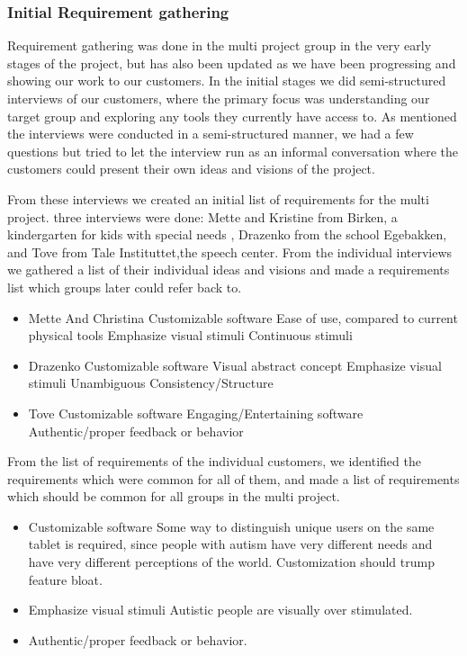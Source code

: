 \subsubsection*{Initial Requirement gathering}
Requirement gathering was done in the multi project group in the very early stages of the project, but has also been updated as we have been progressing and showing our work to our customers.
In the initial stages we did semi-structured interviews of our customers, where the primary focus was understanding our target group and exploring any tools they currently have access to.
As mentioned the interviews were conducted in a semi-structured manner, we had a few questions%
but tried to let the interview run as an informal conversation where the customers could present their own ideas and visions of the project.

From these interviews we created an initial list of requirements for the multi project.
three interviews were done: Mette and Kristine from Birken, a kindergarten for kids with special needs , Drazenko from the school Egebakken, and Tove from Tale Instituttet,the speech center.
From the individual interviews we gathered a list of their individual ideas and visions and made a requirements list which groups later could refer back to.

\begin{itemize}
 \item Mette And Christina 
  \subitem Customizable software
  \subitem Ease of use, compared to current physical tools
  \subitem Emphasize visual stimuli
  \subitem Continuous stimuli 
 \item Drazenko
  \subitem Customizable software
  \subitem Visual abstract concept
  \subitem Emphasize visual stimuli
  \subitem Unambiguous
  \subitem Consistency/Structure
 \item Tove 
  \subitem Customizable software
  \subitem Engaging/Entertaining software
  \subitem Authentic/proper feedback or behavior
\end{itemize}

From the list of requirements of the individual customers, we identified the requirements which were common for all of them, and made a list of requirements which
should be common for all groups in the multi project.

\begin{itemize}
 \item Customizable software
  \subitem Some way to distinguish unique users on the same tablet is required, since people with autism have very different needs and have very different perceptions of the world.
  \subitem Customization should trump feature bloat.
 \item Emphasize visual stimuli
  \subitem Autistic people are visually over stimulated.
 \item Authentic/proper feedback or behavior.
\end{itemize}

